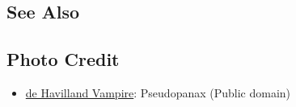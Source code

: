 \subsection{See Also}

\begin{typelist}
\end{typelist}

\subsection{Photo Credit}
\begin{itemize}\raggedright
    \item \href{https://commons.wikimedia.org/wiki/File:De_Havilland_DH115_Vampire_banking_with_the_sun_reflecting_off_its_silver_wings_(cropped).jpg}{de Havilland Vampire}: Pseudopanax (Public domain)
\end{itemize}
